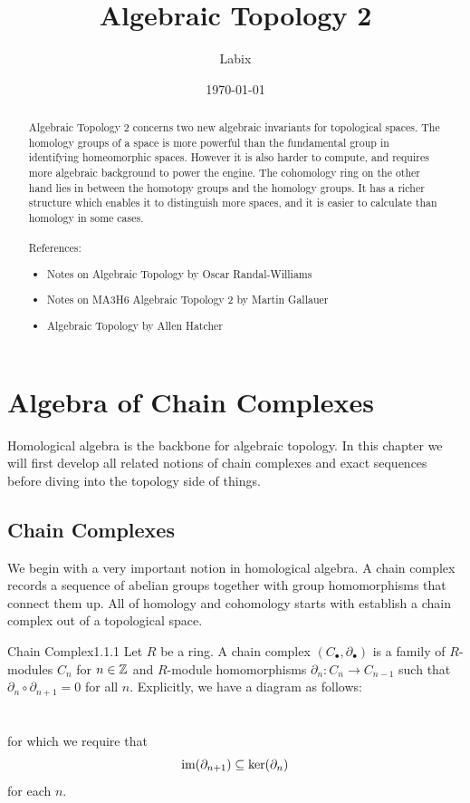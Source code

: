 \documentclass[a4paper]{article}
\title{Algebraic Topology 2}
\author{Labix}
\date{\today}
\begin{document}
\maketitle
\begin{abstract}
Algebraic Topology 2 concerns two new algebraic invariants for topological spaces. The homology groups of a space is more powerful than the fundamental group in identifying homeomorphic spaces. However it is also harder to compute, and requires more algebraic background to power the engine. The cohomology ring on the other hand lies in between the homotopy groups and the homology groups. It has a richer structure which enables it to distinguish more spaces, and it is easier to calculate than homology in some cases. \\~\\

References: 
\begin{itemize}
\item Notes on Algebraic Topology by Oscar Randal-Williams
\item Notes on MA3H6 Algebraic Topology 2 by Martin Gallauer
\item Algebraic Topology by Allen Hatcher
\end{itemize}
\end{abstract}
\pagebreak
\tableofcontents

\pagebreak

\section{Algebra of Chain Complexes}
Homological algebra is the backbone for algebraic topology. In this chapter we will first develop all related notions of chain complexes and exact sequences before diving into the topology side of things. 

\subsection{Chain Complexes}
We begin with a very important notion in homological algebra. A chain complex records a sequence of abelian groups together with group homomorphisms that connect them up. All of homology and cohomology starts with establish a chain complex out of a topological space. 

\begin{defn}{Chain Complex}{1.1.1} Let $R$ be a ring. A chain complex $(C_\bullet,\partial_\bullet)$ is a family of $R$-modules $C_n$ for $n\in\mathbb{Z}$ and $R$-module homomorphisms $\partial_n:C_n\to C_{n-1}$ such that $\partial_n\circ\partial_{n+1}=0$ for all $n$. Explicitly, we have a diagram as follows: \\
\\~\\
for which we require that $$\operatorname{im}(\partial_{n+1})\subseteq\ker(\partial_n)$$ for each $n$. 
\end{defn}
\end{document}
